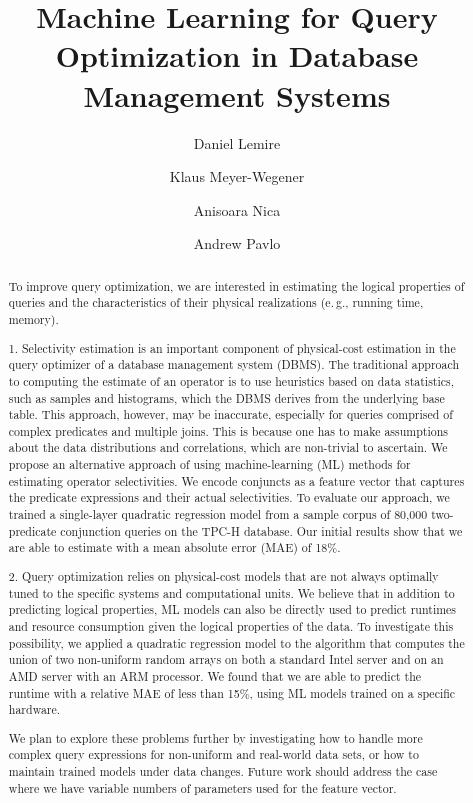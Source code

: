 \documentclass[a4paper,USenglish]{dfu}
\title{Machine Learning for Query Optimization in Database Management Systems
  }
\author[1]{Daniel Lemire}
\author[2]{Klaus Meyer-Wegener}
\author[3]{Anisoara Nica}
\author[4]{Andrew Pavlo}
\affil[1]{University of Quebec\\
  Montreal, Canada\\
  \texttt{lemire@gmail.com}}
\affil[2]{Friedrich-Alexander-Universität Erlangen-Nürnberg\\
  Germany\\
  \texttt{klaus.meyer-wegener@fau.de}}
\affil[3]{SAP SE\\
  Waterloo, Canada\\
  \texttt{anica@acm.org}}
\affil[4]{Carnegie Mellon University\\
  Pittsburgh, USA\\
  \texttt{pavlo@cs.cmu.edu}}
\begin{document}
\maketitle

\begin{abstract}
To improve query optimization,
we are interested in estimating the logical properties of queries
and the characteristics of their physical realizations
(e.\,g., running time, memory).

1. Selectivity estimation is an important component of physical-cost estimation in the query optimizer of a database management system (DBMS). The traditional approach to computing the estimate of an operator is to use heuristics based on data statistics, such as samples and histograms, which the DBMS derives from the underlying base table. This approach, however, may be inaccurate, especially for queries comprised of complex predicates and multiple joins. This is because one has to make assumptions about the data distributions and correlations, which are non-trivial to ascertain. We propose an alternative approach of using machine-learning (ML) methods for estimating operator selectivities. We encode conjuncts as a feature vector that captures the predicate expressions and their actual selectivities. To evaluate our approach, we trained a single-layer quadratic regression model from a sample corpus of 80,000 two-predicate conjunction queries on the TPC-H database. Our initial results show that we are able to estimate with a mean absolute error (MAE) of 18\%.

2. Query optimization relies on physical-cost models that are not always optimally tuned to the specific systems and computational units. We believe that in addition to predicting logical properties, ML models can also be directly used to predict runtimes and resource consumption given the logical properties of the data. To investigate this possibility, we applied a quadratic regression model to the algorithm that computes the union of two non-uniform random arrays on both a standard Intel server and on an AMD server with an ARM processor. We found that we are able to predict the runtime with a relative MAE of less than 15\%, using ML models trained on a specific hardware.

We plan to explore these problems further by investigating how to handle more complex query expressions for non-uniform and real-world data sets, or how to maintain trained 
models under data changes. Future work should address the case where we have variable numbers of parameters used for the feature vector.
\end{abstract}
\end{document}
